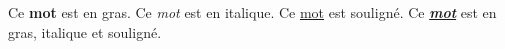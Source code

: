 \documentclass{article}
\begin{document}
Ce \textbf{mot} est en gras.
Ce \textit{mot} est en italique.
Ce \underline{mot} est souligné.
Ce \textbf{\textit{\underline{mot}}} est en gras, italique et souligné.
\end{document}
